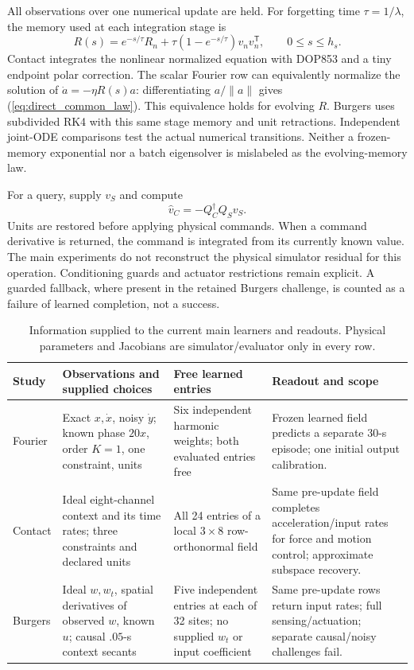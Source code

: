 \documentclass[journal]{IEEEtran}
\begin{document}
All observations over one numerical update are held. For forgetting time
$\tau=1/\lambda$, the memory used at each integration stage is
\begin{equation}
 R(s)=e^{-s/\tau}R_n+\tau(1-e^{-s/\tau})v_nv_n^{\mathsf T},
 \qquad 0\le s\le h_s.
 \label{eq:direct_stage_memory}
\end{equation}
Contact integrates the nonlinear normalized equation with DOP853 and a tiny
endpoint polar correction. The scalar Fourier row can equivalently normalize
the solution of $\dot a=-\eta R(s)a$: differentiating $a/\|a\|$ gives
(\ref{eq:direct_common_law}). This equivalence holds for evolving $R$.
Burgers uses subdivided RK4 with this same stage memory and unit retractions.
Independent joint-ODE comparisons test the actual numerical transitions.
Neither a frozen-memory exponential nor a batch eigensolver is mislabeled
as the evolving-memory law.

For a query, supply $v_S$ and compute
\begin{equation}
 \widehat v_C=-Q_C^\dagger Q_Sv_S.
 \label{eq:direct_common_readout}
\end{equation}
Units are restored before applying physical commands. When a command derivative
is returned, the command is integrated from its currently known value.
The main experiments do not reconstruct the physical simulator residual
for this operation. Conditioning guards and actuator restrictions remain
explicit. A guarded fallback, where present in the retained Burgers
challenge, is counted as a failure of learned completion, not a success.

\begin{table}[t]
\centering
\caption{Information supplied to the current main learners and readouts.
Physical parameters and Jacobians are simulator/evaluator only in every row.}
\begin{tabular}{p{}p{}p{}p{}}
\toprule Study & Observations and supplied choices & Free learned entries & Readout and scope \\
\midrule
Fourier & Exact $x,\dot x$, noisy $\dot y$; known phase $20x$, order $K=1$, one constraint, units & Six independent harmonic weights; both evaluated entries free & Frozen learned field predicts a separate 30-s episode; one initial output calibration. \\
Contact & Ideal eight-channel context and its time rates; three constraints and declared units & All 24 entries of a local $3\times8$ row-orthonormal field & Same pre-update field completes acceleration/input rates for force and motion control; approximate subspace recovery. \\
Burgers & Ideal $w,w_t$, spatial derivatives of observed $w$, known $u$; causal $.05$-s context secants & Five independent entries at each of 32 sites; no supplied $w_t$ or input coefficient & Same pre-update rows return input rates; full sensing/actuation; separate causal/noisy challenges fail. \\
\bottomrule
\end{tabular}
\label{tab:direct_information}
\end{table}
\end{document}
